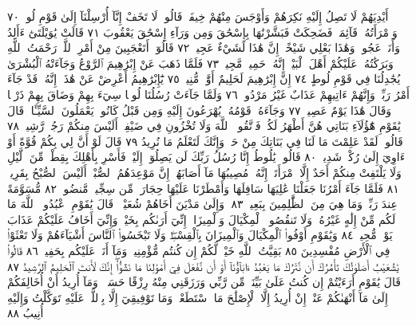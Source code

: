 أَيْدِيَهُمْ لَا تَصِلُ إِلَيْهِ نَكِرَهُمْ وَأَوْجَسَ مِنْهُمْ خِيفَةࣰۚ
قَالُوا۟ لَا تَخَفْ إِنَّآ أُرْسِلْنَآ إِلَىٰ قَوْمِ لُوطࣲ ٧٠ وَٱمْرَأَتُهُۥ قَآئِمَةࣱ
فَضَحِكَتْ فَبَشَّرْنَٰهَا بِإِسْحَٰقَ وَمِن وَرَآءِ إِسْحَٰقَ يَعْقُوبَ ٧١
قَالَتْ يَٰوَيْلَتَىٰٓ ءَأَلِدُ وَأَنَا۠ عَجُوزࣱ وَهَٰذَا بَعْلِي شَيْخًاۖ إِنَّ هَٰذَا
لَشَيْءٌ عَجِيبࣱ ٧٢ قَالُوٓا۟ أَتَعْجَبِينَ مِنْ أَمْرِ ٱللَّهِۖ رَحْمَتُ ٱللَّهِ
وَبَرَكَٰتُهُۥ عَلَيْكُمْ أَهْلَ ٱلْبَيْتِۚ إِنَّهُۥ حَمِيدࣱ مَّجِيدࣱ ٧٣ فَلَمَّا ذَهَبَ
عَنْ إِبْرَٰهِيمَ ٱلرَّوْعُ وَجَآءَتْهُ ٱلْبُشْرَىٰ يُجَٰدِلُنَا فِي قَوْمِ لُوطٍ ٧٤
إِنَّ إِبْرَٰهِيمَ لَحَلِيمٌ أَوَّٰهࣱ مُّنِيبࣱ ٧٥ يَٰٓإِبْرَٰهِيمُ أَعْرِضْ عَنْ هَٰذَآۖ إِنَّهُۥ
قَدْ جَآءَ أَمْرُ رَبِّكَۖ وَإِنَّهُمْ ءَاتِيهِمْ عَذَابٌ غَيْرُ مَرْدُودࣲ ٧٦ وَلَمَّا
جَآءَتْ رُسُلُنَا لُوطࣰا سِيٓءَ بِهِمْ وَضَاقَ بِهِمْ ذَرْعࣰا وَقَالَ هَٰذَا
يَوْمٌ عَصِيبࣱ ٧٧ وَجَآءَهُۥ قَوْمُهُۥ يُهْرَعُونَ إِلَيْهِ وَمِن قَبْلُ كَانُوا۟
يَعْمَلُونَ ٱلسَّيِّـَٔاتِۚ قَالَ يَٰقَوْمِ هَٰٓؤُلَآءِ بَنَاتِي هُنَّ أَطْهَرُ لَكُمْۖ
فَٱتَّقُوا۟ ٱللَّهَ وَلَا تُخْزُونِ فِي ضَيْفِيٓۖ أَلَيْسَ مِنكُمْ رَجُلࣱ رَّشِيدࣱ ٧٨
قَالُوا۟ لَقَدْ عَلِمْتَ مَا لَنَا فِي بَنَاتِكَ مِنْ حَقࣲّ وَإِنَّكَ لَتَعْلَمُ مَا نُرِيدُ ٧٩
قَالَ لَوْ أَنَّ لِي بِكُمْ قُوَّةً أَوْ ءَاوِيٓ إِلَىٰ رُكْنࣲ شَدِيدࣲ ٨٠ قَالُوا۟
يَٰلُوطُ إِنَّا رُسُلُ رَبِّكَ لَن يَصِلُوٓا۟ إِلَيْكَۖ فَأَسْرِ بِأَهْلِكَ بِقِطْعࣲ
مِّنَ ٱلَّيْلِ وَلَا يَلْتَفِتْ مِنكُمْ أَحَدٌ إِلَّا ٱمْرَأَتَكَۖ إِنَّهُۥ مُصِيبُهَا
مَآ أَصَابَهُمْۚ إِنَّ مَوْعِدَهُمُ ٱلصُّبْحُۚ أَلَيْسَ ٱلصُّبْحُ بِقَرِيبࣲ ٨١
فَلَمَّا جَآءَ أَمْرُنَا جَعَلْنَا عَٰلِيَهَا سَافِلَهَا وَأَمْطَرْنَا عَلَيْهَا
حِجَارَةࣰ مِّن سِجِّيلࣲ مَّنضُودࣲ ٨٢ مُّسَوَّمَةً عِندَ رَبِّكَۖ
وَمَا هِيَ مِنَ ٱلظَّٰلِمِينَ بِبَعِيدࣲ ٨٣۞ وَإِلَىٰ مَدْيَنَ أَخَاهُمْ
شُعَيْبࣰاۚ قَالَ يَٰقَوْمِ ٱعْبُدُوا۟ ٱللَّهَ مَا لَكُم مِّنْ إِلَٰهٍ غَيْرُهُۥۖ
وَلَا تَنقُصُوا۟ ٱلْمِكْيَالَ وَٱلْمِيزَانَۖ إِنِّيٓ أَرَىٰكُم بِخَيْرࣲ
وَإِنِّيٓ أَخَافُ عَلَيْكُمْ عَذَابَ يَوْمࣲ مُّحِيطࣲ ٨٤ وَيَٰقَوْمِ
أَوْفُوا۟ ٱلْمِكْيَالَ وَٱلْمِيزَانَ بِٱلْقِسْطِۖ وَلَا تَبْخَسُوا۟ ٱلنَّاسَ
أَشْيَآءَهُمْ وَلَا تَعْثَوْا۟ فِي ٱلْأَرْضِ مُفْسِدِينَ ٨٥ بَقِيَّتُ
ٱللَّهِ خَيْرࣱ لَّكُمْ إِن كُنتُم مُّؤْمِنِينَۚ وَمَآ أَنَا۠ عَلَيْكُم
بِحَفِيظࣲ ٨٦ قَالُوا۟ يَٰشُعَيْبُ أَصَلَوٰتُكَ تَأْمُرُكَ أَن نَّتْرُكَ
مَا يَعْبُدُ ءَابَآؤُنَآ أَوْ أَن نَّفْعَلَ فِيٓ أَمْوَٰلِنَا مَا نَشَٰٓؤُا۟ۖ إِنَّكَ
لَأَنتَ ٱلْحَلِيمُ ٱلرَّشِيدُ ٨٧ قَالَ يَٰقَوْمِ أَرَءَيْتُمْ إِن كُنتُ
عَلَىٰ بَيِّنَةࣲ مِّن رَّبِّي وَرَزَقَنِي مِنْهُ رِزْقًا حَسَنࣰاۚ وَمَآ أُرِيدُ أَنْ
أُخَالِفَكُمْ إِلَىٰ مَآ أَنْهَىٰكُمْ عَنْهُۚ إِنْ أُرِيدُ إِلَّا ٱلْإِصْلَٰحَ
مَا ٱسْتَطَعْتُۚ وَمَا تَوْفِيقِيٓ إِلَّا بِٱللَّهِۚ عَلَيْهِ تَوَكَّلْتُ وَإِلَيْهِ أُنِيبُ ٨٨
